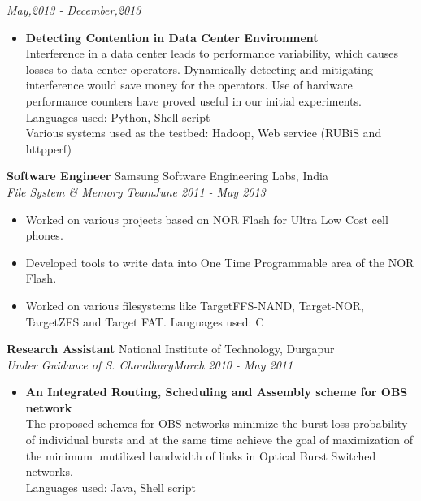 \documentclass[margin,line]{res}
\begin{document}
\begin{resume}
\hspace{10cm} \hfill {\it May,2013 - December,2013}
\begin{itemize}
	\item \textbf{Detecting Contention in Data Center Environment}\\
	Interference in a data center leads to performance variability, which causes losses to data center operators. Dynamically detecting and mitigating interference
	would save money for the operators. Use of hardware performance counters have proved useful in our initial experiments.\\
	Languages used: Python, Shell script \\
	Various systems used as the testbed: Hadoop, Web service (RUBiS and httpperf)\\
\end{itemize}	
\textbf{Software Engineer} \hfill Samsung Software Engineering Labs, India \\ 
\textit{File System \& Memory Team}\hfill {\it June 2011 - May 2013}
	\begin{itemize}
		\setlength{\itemsep}{-10pt}
		\item Worked on various projects based on NOR Flash for Ultra Low Cost cell phones.\\
		\item Developed tools to write data into One Time Programmable area of the NOR Flash.\\
		\item Worked on various filesystems like TargetFFS-NAND, Target-NOR, TargetZFS and Target FAT.
		Languages used: C\\
	\end{itemize}

\newpage
\textbf{Research Assistant} \hfill National Institute of Technology, Durgapur \\ 
\textit{Under Guidance of S. Choudhury}\hfill {\it March 2010 - May 2011}
	\begin{itemize}
		\item \textbf{An Integrated Routing, Scheduling and Assembly scheme for OBS network}\\
		The proposed schemes for OBS networks minimize the burst loss probability of individual bursts and at the same time achieve the goal of maximization of the 
		minimum unutilized bandwidth of links in Optical Burst Switched networks.\\
		Languages used: Java, Shell script\\
	\end{itemize}		
	

\end{resume}
\end{document}

